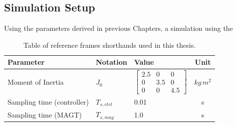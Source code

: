 \subsubsection{}


\subsection{Simulation Setup}
Using the parameters derived in previous Chapters, a simulation using the 



\vspace{1cm}

\begingroup
\begin{table}[H]
    \centering
    \begin{tabular}{@{}p{5cm} p{2cm} p{5cm} c}
        Parameter & Notation & Value & Unit \\
        \hline
        Moment of Inertia & $J_0$ & $\begin{bmatrix}
            2.5 & 0 & 0 \\
            0 & 3.5 & 0 \\
            0 & 0 & 4.5
        \end{bmatrix}$ & $kg\,m^2$  \\
        \hline
        Sampling time (controller) & $T_{s,ctrl}$ & 0.01 & s \\
        \hline
        Sampling time (MAGT) & $T_{s,mag}$ & 1.0 & s \\
        \hline
        
        \hline
    \end{tabular}
\caption{Table of reference frames shorthands used in this thesis.}
\end{table}
\endgroup

\vspace{1cm}

